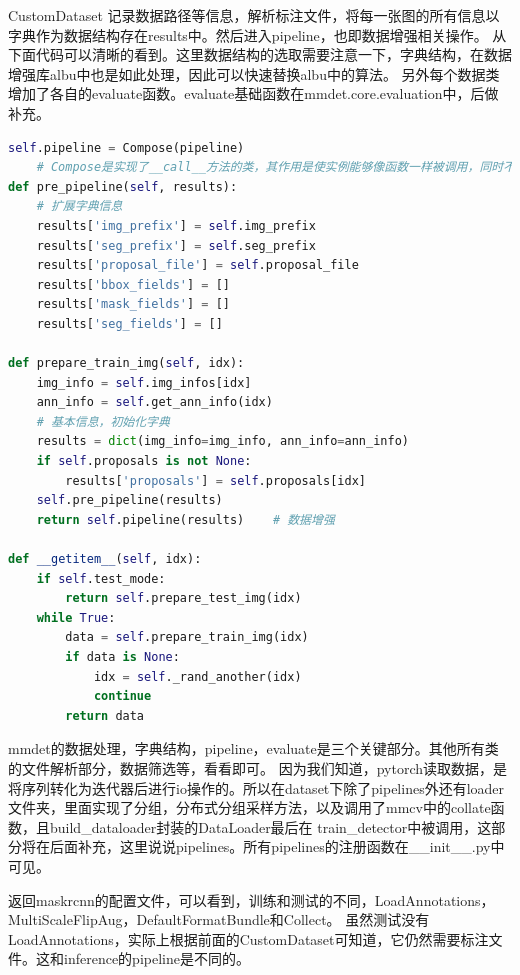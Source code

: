 \documentclass[UTF8]{ctexart}
\begin{document}
CustomDataset 记录数据路径等信息，解析标注文件，将每一张图的所有信息以字典作为数据结构存在results中。然后进入pipeline，也即数据增强相关操作。
从下面代码可以清晰的看到。这里数据结构的选取需要注意一下，字典结构，在数据增强库albu中也是如此处理，因此可以快速替换albu中的算法。
另外每个数据类增加了各自的evaluate函数。evaluate基础函数在mmdet.core.evaluation中，后做补充。

\lstset{style=mystyle}
\begin{lstlisting}[language=Python]
	self.pipeline = Compose(pipeline)   
	# Compose是实现了__call__方法的类，其作用是使实例能够像函数一样被调用，同时不影响实例本身的生命周期
def pre_pipeline(self, results):
	# 扩展字典信息
	results['img_prefix'] = self.img_prefix
	results['seg_prefix'] = self.seg_prefix
	results['proposal_file'] = self.proposal_file
	results['bbox_fields'] = []
	results['mask_fields'] = []
	results['seg_fields'] = []

def prepare_train_img(self, idx):
	img_info = self.img_infos[idx]
	ann_info = self.get_ann_info(idx)
	# 基本信息，初始化字典
	results = dict(img_info=img_info, ann_info=ann_info)
	if self.proposals is not None:
		results['proposals'] = self.proposals[idx]
	self.pre_pipeline(results)
	return self.pipeline(results)    # 数据增强

def __getitem__(self, idx):
	if self.test_mode:
		return self.prepare_test_img(idx)
	while True:
		data = self.prepare_train_img(idx)
		if data is None:
			idx = self._rand_another(idx)
			continue
		return data
\end{lstlisting}

mmdet的数据处理，字典结构，pipeline，evaluate是三个关键部分。其他所有类的文件解析部分，数据筛选等，看看即可。
因为我们知道，pytorch读取数据，是将序列转化为迭代器后进行io操作的。所以在dataset下除了pipelines外还有loader
文件夹，里面实现了分组，分布式分组采样方法，以及调用了mmcv中的collate函数，且build\_dataloader封装的DataLoader最后在
train\_detector中被调用，这部分将在后面补充，这里说说pipelines。所有pipelines的注册函数在\_\_init\_\_.py中可见。

返回maskrcnn的配置文件，可以看到，训练和测试的不同，LoadAnnotations，MultiScaleFlipAug，DefaultFormatBundle和Collect。
虽然测试没有LoadAnnotations，实际上根据前面的CustomDataset可知道，它仍然需要标注文件。这和inference的pipeline是不同的。
\end{document}
